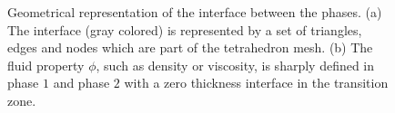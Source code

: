 \documentclass[a4paper,portuges]{article}
\begin{document}
\begin{figure}[ht!]
	\caption{Geometrical representation of the interface between the
	phases. (a) The interface (gray colored) is represented by a set of
	triangles, edges and nodes which are part of the tetrahedron mesh.
	(b) The fluid property $\phi$, such as density or viscosity, is
	sharply defined in phase $1$ and phase $2$ with a zero thickness
	interface in the transition zone.}
	\label{fig:inter} 
\end{figure}
\end{document}
